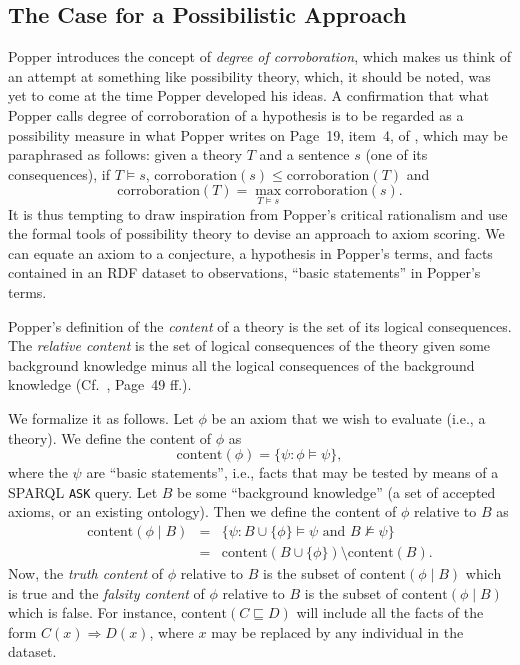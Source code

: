 \documentclass{llncs}
\begin{document}
\subsection{The Case for a Possibilistic Approach}

Popper introduces the concept of \emph{degree of corroboration}, which makes us think
of an attempt at something like possibility theory, which, it should be noted, was
yet to come at the time Popper developed his ideas.
A confirmation that what Popper calls degree of corroboration of a hypothesis
is to be regarded as a possibility measure in what Popper writes on Page~19,
item~4, of \cite{Popper1972}, which may be paraphrased as follows:
given a theory $T$ and a sentence $s$ (one of its consequences),
if $T \models s$, $\mathrm{corroboration}(s) \leq \mathrm{corroboration}(T)$
and
\[
  \mathrm{corroboration}(T) = \max_{T \models s} \mathrm{corroboration}(s).
\]
It is thus tempting to draw inspiration from Popper's critical rationalism
and use the formal tools of possibility theory to devise an approach to axiom scoring. 
We can equate an axiom to a conjecture, a hypothesis in Popper's terms,
and facts contained in an RDF dataset to observations, ``basic statements''
in Popper's terms.

Popper's definition of the \emph{content} of a theory is the set of its logical consequences.
The \emph{relative content} is the set of logical consequences of the theory
given some background knowledge minus all the logical consequences of the
background knowledge (Cf.~\cite{Popper1972}, Page~49 ff.).

We formalize it as follows. 
Let $\phi$ be an axiom that we wish to evaluate (i.e., a theory). 
We define the content of $\phi$ as 
\begin{equation}\label{eq:content}
  \mathrm{content}(\phi) = \{\psi : \phi \models \psi\},
\end{equation}
\noindent
where the $\psi$ are
``basic statements'', i.e., facts that may be tested by means of a SPARQL \texttt{ASK} query.
Let $B$ be some ``background knowledge'' (a set of accepted axioms, or an existing ontology).
Then we define the content of $\phi$ relative to $B$ as
\begin{equation}\label{eq:relative-content}
  \begin{array}{rcl}
    \mathrm{content}(\phi \mid B) &=& \{\psi : B \cup \{\phi\} \models \psi \mbox{ and } B \not\models \psi\} \\
    &=& \mathrm{content}(B \cup \{\phi\}) \setminus \mathrm{content}(B).
  \end{array}
\end{equation}
Now, the \emph{truth content} of $\phi$ relative to $B$ is the subset
of $\mathrm{content}(\phi \mid B)$ which is true and the \emph{falsity content}
of $\phi$ relative to $B$ is the subset of $\mathrm{content}(\phi \mid B)$ which
is false.
For instance, $\mathrm{content}(C \sqsubseteq D)$ will include
all the facts of the form $C(x) \Rightarrow D(x)$, where $x$ may be replaced by
any individual in the dataset.
\end{document}
